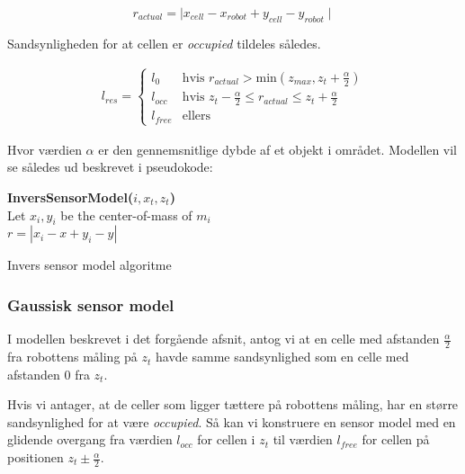 \begin{equation}
r_{actual} = \mid x_{cell} - x_{robot} + y_{cell} - y_{robot} \mid
\end{equation}

Sandsynligheden for at cellen er  \emph{occupied} tildeles således.

\begin{equation}
\begin{split}
l_{res} = \begin{cases} 
	l_0 &\text{hvis }r_{actual} > \text{min}(z_{max},z_t+\frac{\alpha}{2}) \\ 
	l_{occ} &\text{hvis } z_t-\frac{\alpha}{2} \leq r_{actual} \leq z_t+\frac{\alpha}{2}\\ 
	l_{free} &\text{ellers}  
\end{cases}
\end{split}
\end{equation}

Hvor værdien $\alpha$ er den gennemsnitlige dybde af et objekt i området.
Modellen vil se således ud beskrevet i pseudokode:

\begin{algorithm}[H]
\textbf{InversSensorModel($i, x_t, z_t$)} \\
Let $x_i,y_i$ be the center-of-mass of $m_i$ \\
$r = |x_i - x + y_i - y|$ \\
\caption{Invers sensor model algoritme}
\label{alg:inversesensormodel}
\end{algorithm}

\subsubsection{Gaussisk sensor model}

I modellen beskrevet i det forgående afsnit, antog vi at en celle
med afstanden $\frac{\alpha}{2}$ fra robottens måling på $z_t$ havde
samme sandsynlighed som en celle med afstanden 0 fra $z_t$.

Hvis vi antager, at de celler som ligger tættere på robottens måling,
har en større sandsynlighed for at være \emph{occupied}. 
Så kan vi konstruere en sensor model med en glidende overgang fra værdien $l_{occ}$ for 
cellen i $z_t$ til værdien $l_{free}$ for cellen på positionen $z_t \pm \frac{\alpha}{2}$. 

